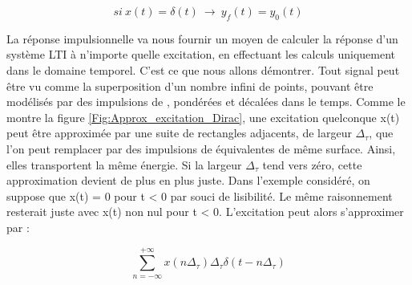 \begin{remark}{}
	\begin{equation}\label{}
          si~x(t)=\delta (t)~\rightarrow ~y_{f}(t) = y_{0}(t)	 	
	\end{equation}
	
	
	
	\vspace{1\baselineskip} La réponse impulsionnelle va nous
        fournir un moyen de calculer la réponse d'un système LTI à
        n'importe quelle excitation, en effectuant les calculs
        uniquement dans le domaine temporel. C'est ce que nous allons
        démontrer. Tout signal peut être vu comme la superposition
        d'un nombre infini de points, pouvant être modélisés par des
        impulsions de \Dirac, pondérées et décalées dans le
        temps. Comme le montre la figure
        \ref{Fig:Approx_excitation_Dirac}, une excitation quelconque
        x(t) peut être approximée par une suite de rectangles
        adjacents, de largeur $ \Delta_\tau $, que l'on peut remplacer
        par des impulsions de \Dirac{} équivalentes de même
        surface. Ainsi, elles transportent la même énergie. Si la
        largeur $ \Delta_\tau $ tend vers zéro, cette approximation
        devient de plus en plus juste. Dans l'exemple considéré, on
        suppose que x(t) = 0 pour t \textless{} 0 par souci de
        lisibilité. Le même raisonnement resterait juste avec x(t) non
        nul pour t \textless{} 0. L'excitation peut alors s'approximer
        par :
	
	
	\begin{equation*}\label{}
          \sum_{n=-\infty}^{+\infty}x(n\Delta_\tau) 	\Delta_\tau  \delta (t-n\Delta_\tau)	
	\end{equation*}
	

\end{remark}
